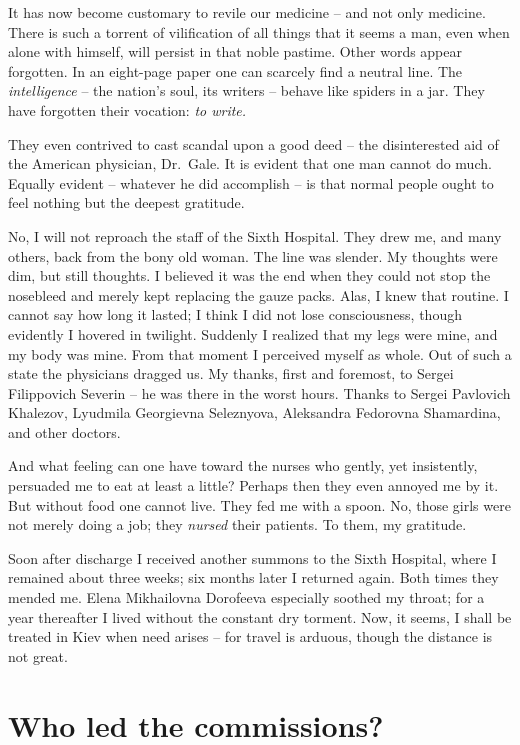 \documentclass[openright]{bookest}
\begin{document}
It has now become customary to revile our medicine -- and not only medicine. There is such a torrent of vilification of all things that it seems a man, even when alone with himself, will persist in that noble pastime. Other words appear forgotten. In an eight-page paper one can scarcely find a neutral line. The \textit{intelligence} -- the nation's soul, its writers -- behave like spiders in a jar. They have forgotten their vocation: \textit{to write.}

They even contrived to cast scandal upon a good deed -- the disinterested aid of the American physician, Dr.~Gale. It is evident that one man cannot do much. Equally evident -- whatever he did accomplish -- is that normal people ought to feel nothing but the deepest gratitude.

No, I will not reproach the staff of the Sixth Hospital. They drew me, and many others, back from the bony old woman. The line was slender. My thoughts were dim, but still thoughts. I believed it was the end when they could not stop the nosebleed and merely kept replacing the gauze packs. Alas, I knew that routine. I cannot say how long it lasted; I think I did not lose consciousness, though evidently I hovered in twilight. Suddenly I realized that my legs were mine, and my body was mine. From that moment I perceived myself as whole. Out of such a state the physicians dragged us. My thanks, first and foremost, to Sergei Filippovich Severin -- he was there in the worst hours. Thanks to Sergei Pavlovich Khalezov, Lyudmila Georgievna Seleznyova, Aleksandra Fedorovna Shamardina, and other doctors.

And what feeling can one have toward the nurses who gently, yet insistently, persuaded me to eat at least a little? Perhaps then they even annoyed me by it. But without food one cannot live. They fed me with a spoon. No, those girls were not merely doing a job; they \textit{nursed} their patients. To them, my gratitude.

Soon after discharge I received another summons to the Sixth Hospital, where I remained about three weeks; six months later I returned again. Both times they mended me. Elena Mikhailovna Dorofeeva especially soothed my throat; for a year thereafter I lived without the constant dry torment. Now, it seems, I shall be treated in Kiev when need arises -- for travel is arduous, though the distance is not great.

\chapter{Who led the commissions?}
\end{document}
